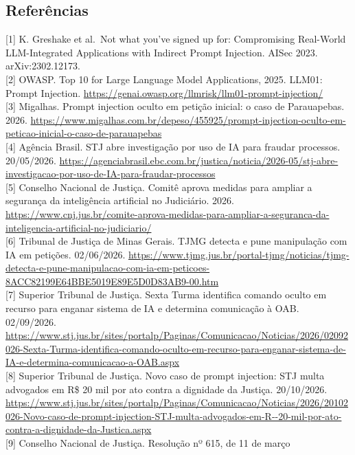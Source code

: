 \documentclass[
  brazilian,
  11pt,
]{article}
\begin{document}
\subsection{Referências}\label{referuxeancias}

{[}1{]} K. Greshake et al.~Not what you've signed up for: Compromising
Real-World LLM-Integrated Applications with Indirect Prompt Injection.
AISec 2023. arXiv:2302.12173.\\
{[}2{]} OWASP. Top 10 for Large Language Model Applications, 2025.
LLM01: Prompt Injection.
\url{https://genai.owasp.org/llmrisk/llm01-prompt-injection/}\\
{[}3{]} Migalhas. Prompt injection oculto em petição inicial: o caso de
Parauapebas. 2026.
\url{https://www.migalhas.com.br/depeso/455925/prompt-injection-oculto-em-peticao-inicial-o-caso-de-parauapebas}\\
{[}4{]} Agência Brasil. STJ abre investigação por uso de IA para fraudar
processos. 20/05/2026.
\url{https://agenciabrasil.ebc.com.br/justica/noticia/2026-05/stj-abre-investigacao-por-uso-de-IA-para-fraudar-processos}\\
{[}5{]} Conselho Nacional de Justiça. Comitê aprova medidas para ampliar
a segurança da inteligência artificial no Judiciário. 2026.
\url{https://www.cnj.jus.br/comite-aprova-medidas-para-ampliar-a-seguranca-da-inteligencia-artificial-no-judiciario/}\\
{[}6{]} Tribunal de Justiça de Minas Gerais. TJMG detecta e pune
manipulação com IA em petições. 02/06/2026.
\url{https://www.tjmg.jus.br/portal-tjmg/noticias/tjmg-detecta-e-pune-manipulacao-com-ia-em-peticoes-8ACC82199E64BBE5019E89E5D0D83AB9-00.htm}\\
{[}7{]} Superior Tribunal de Justiça. Sexta Turma identifica comando
oculto em recurso para enganar sistema de IA e determina comunicação à
OAB. 02/09/2026.
\url{https://www.stj.jus.br/sites/portalp/Paginas/Comunicacao/Noticias/2026/02092026-Sexta-Turma-identifica-comando-oculto-em-recurso-para-enganar-sistema-de-IA-e-determina-comunicacao-a-OAB.aspx}\\
{[}8{]} Superior Tribunal de Justiça. Novo caso de prompt injection: STJ
multa advogados em R\$ 20 mil por ato contra a dignidade da Justiça.
20/10/2026.
\url{https://www.stj.jus.br/sites/portalp/Paginas/Comunicacao/Noticias/2026/20102026-Novo-caso-de-prompt-injection-STJ-multa-advogados-em-R--20-mil-por-ato-contra-a-dignidade-da-Justica.aspx}\\
{[}9{]} Conselho Nacional de Justiça. Resolução nº 615, de 11 de março
\end{document}
